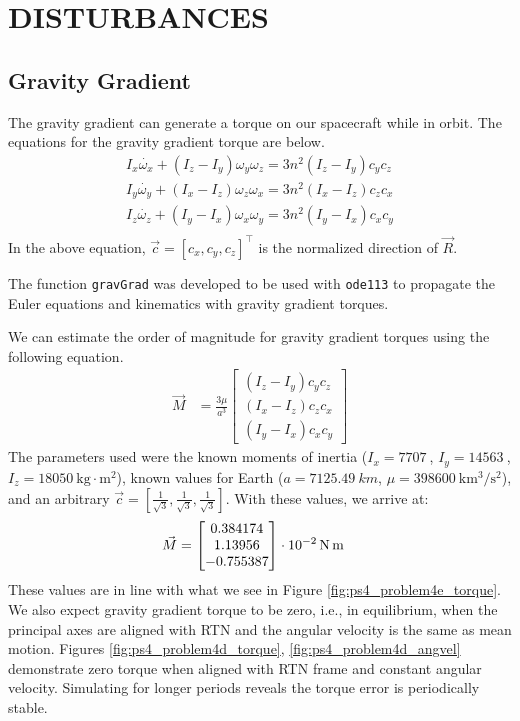 \section{\Large DISTURBANCES}
\subsection{Gravity Gradient}

The gravity gradient can generate a torque on our spacecraft while in orbit. The equations for the gravity gradient torque are below.
\begin{align*}
    I_x \dot{\omega_x} + (I_z - I_y) \omega_y \omega_z = 3 n^2 (I_z - I_y) c_y c_z \\
    I_y \dot{\omega_y} + (I_x - I_z) \omega_z \omega_x = 3 n^2 (I_x - I_z) c_z c_x \\
    I_z \dot{\omega_z} + (I_y - I_x) \omega_x \omega_y = 3 n^2 (I_y - I_x) c_x c_y \\
\end{align*}
In the above equation, $\Vec{c} = [c_x, c_y, c_z]^\intercal$ is the normalized direction of $\Vec{R}$.

The function \texttt{gravGrad} was developed to be used with \texttt{ode113} to propagate the Euler equations and kinematics with gravity gradient torques.




We can estimate the order of magnitude for gravity gradient torques using the following equation.
\begin{align*}
    \Vec{M} &= \frac{3 \mu}{a^3}
    \begin{bmatrix}
    (I_z - I_y) c_y c_z \\
    (I_x - I_z) c_z c_x \\
    (I_y - I_x) c_x c_y
    \end{bmatrix}
\end{align*}
The parameters used were the known moments of inertia ($I_x = \qty{7707}{}$, $I_y = \qty{14563}{}$, $I_z = \qty{18050}{\kilogram\cdot\meter^2}$), known values for Earth ($a = \qty{7125.49}{km}$, $\mu = \qty{398600}{\km^3\per\second^2}$), and an arbitrary $\Vec{c} = [\frac{1}{\sqrt{3}}, \frac{1}{\sqrt{3}}, \frac{1}{\sqrt{3}}]$. With these values, we arrive at:
\begin{align*}
    \Vec{M} &=
\qty[parse-numbers = false]{
    \begin{bmatrix}
    0.384174 \\
    1.13956 \\
    -0.755387
    \end{bmatrix}
    \cdot
    10^{-2}
}{\newton\meter}
\end{align*}
These values are in line with what we see in Figure \ref{fig:ps4_problem4e_torque}. We also expect gravity gradient torque to be zero, i.e., in equilibrium, when the principal axes are aligned with RTN and the angular velocity is the same as mean motion. Figures \ref{fig:ps4_problem4d_torque}, \ref{fig:ps4_problem4d_angvel} demonstrate zero torque when aligned with RTN frame and constant angular velocity. Simulating for longer periods reveals the torque error is periodically stable.

